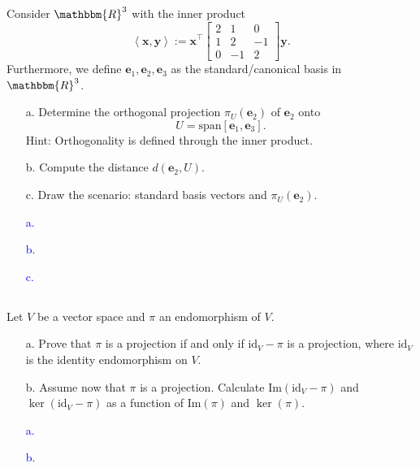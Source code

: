 \documentclass[a4paper,12pt]{article}
\newcommand{\R}{\mathbbm{R}}
\newcommand{\M}[1]{ \begin{bmatrix} #1 \end{bmatrix} }
\newcommand{\vecx}{\textbf{x}}
\newcommand{\vecy}{\textbf{y}}
\newcommand{\vece}{\textbf{e}}
\newcommand{\image}{\textrm{Im}}
\newcommand{\id}{\textrm{id}}
\begin{document}
\subsection{}
Consider $\R^3$ with the inner product
$$\left< \vecx, \vecy \right> := \vecx^\top \M{2&1&0\\1&2&-1\\0&-1&2} \vecy.$$
Furthermore, we define $\vece_1, \vece_2, \vece_3$ as the standard/canonical basis in $\R^3$.
\begin{itemize}
 \item [a.] Determine the orthogonal projection $\pi_U(\vece_2)$ of $\vece_2$ onto
 $$U = \textrm{span}[\vece_1,\vece_3].$$
 Hint: Orthogonality is defined through the inner product.
 \item [b.] Compute the distance $d(\vece_2, U)$.
 \item [c.]Draw the scenario: standard basis vectors and $\pi_U(\vece_2)$.
\end{itemize}
\textcolor{blue}{
\begin{itemize}
 \item [a.]
 \item [b.]
 \item [c.]
\end{itemize}
}
\subsection{}
Let $V$ be a vector space and $\pi$ an endomorphism of $V$.
\begin{itemize}
 \item [a.] Prove that $\pi$ is a projection if and only if $\id_V-\pi$ is a projection, where $\id_V$ is the identity endomorphism on $V$.
 \item [b.] Assume now that $\pi$ is a projection. Calculate $\image(\id_V-\pi)$ and $\ker(\id_V-\pi)$ as a function of $\image(\pi)$ and $\ker(\pi)$.
\end{itemize}
\textcolor{blue}{
\begin{itemize}
 \item [a.]
 \item [b.]
\end{itemize}
}
\end{document}
